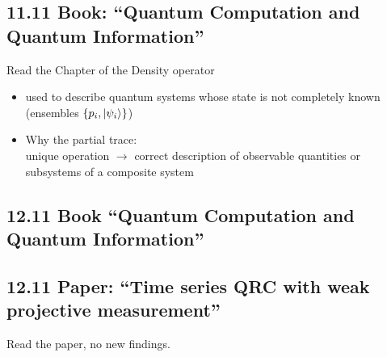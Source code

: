 \subsection*{11.11 \quad Book: ``Quantum Computation and Quantum Information''}
Read the Chapter of the Density operator
\begin{itemize}
    \item used to describe quantum systems whose state is not completely known (ensembles $\{p_i, \ket{\psi_i}\}$)
    \item Why the partial trace: \\
    unique operation $\to$ correct description of observable quantities or subsystems of a composite system
\end{itemize}

\subsection*{12.11 \quad Book ``Quantum Computation and Quantum Information''}

\subsection*{12.11 \quad Paper: ``Time series QRC with weak projective measurement''}
Read the paper, no new findings.

